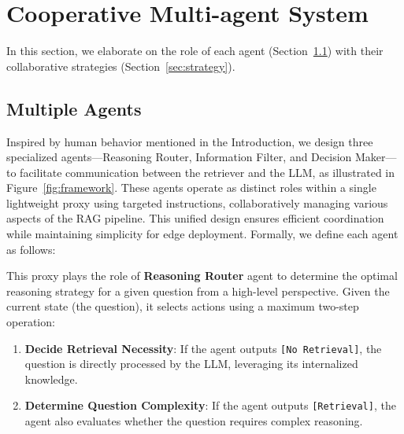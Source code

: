 \section{Cooperative Multi-agent System}
In this section, we elaborate on the role of each agent (Section~\ref{sec:multi_agents}) with their collaborative strategies (Section~\ref{sec:strategy}). %

\subsection{Multiple Agents}\label{sec:multi_agents}
Inspired by human behavior mentioned in the Introduction, we design three specialized agents—Reasoning Router, Information Filter, and Decision Maker—to facilitate communication between the retriever and the LLM, as illustrated in Figure~\ref{fig:framework}. 
These agents operate as distinct roles within a single lightweight proxy using targeted instructions, collaboratively managing various aspects of the RAG pipeline. 
This unified design ensures efficient coordination while maintaining simplicity for edge deployment. 
Formally, we define each agent as follows:

This proxy plays the role of \textbf{Reasoning Router} agent to determine the optimal reasoning strategy for a given question from a high-level perspective. 
Given the current state (the question), it selects actions using a maximum two-step operation:
\begin{enumerate}[topsep=1pt, partopsep=1pt, leftmargin=12pt, itemsep=-1pt]
    \item \textbf{Decide Retrieval Necessity}: If the agent outputs \texttt{[No Retrieval]},  the question is directly processed by the LLM, leveraging its internalized knowledge.
    \item \textbf{Determine Question Complexity}: If the agent outputs \texttt{[Retrieval]}, the agent also evaluates whether the question requires complex reasoning. 
\end{enumerate}

